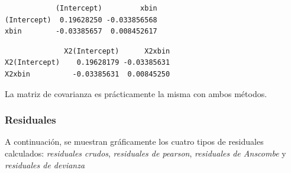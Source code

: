 \documentclass[
  letterpaper,
  DIV=11,
  numbers=noendperiod]{scrartcl}
\newenvironment{Shaded}{\begin{snugshade}}{\end{snugshade}}
\newcommand{\AttributeTok}[1]{\textcolor[rgb]{0.40,0.45,0.13}{#1}}
\newcommand{\FunctionTok}[1]{\textcolor[rgb]{0.28,0.35,0.67}{#1}}
\newcommand{\NormalTok}[1]{\textcolor[rgb]{0.00,0.23,0.31}{#1}}
\newcommand{\OtherTok}[1]{\textcolor[rgb]{0.00,0.23,0.31}{#1}}
\newcommand{\SpecialCharTok}[1]{\textcolor[rgb]{0.37,0.37,0.37}{#1}}
\begin{document}
\begin{verbatim}
            (Intercept)         xbin
(Intercept)  0.19628250 -0.033856568
xbin        -0.03385657  0.008452617
\end{verbatim}

\begin{verbatim}
              X2(Intercept)      X2xbin
X2(Intercept)    0.19628179 -0.03385631
X2xbin          -0.03385631  0.00845250
\end{verbatim}

La matriz de covarianza es prácticamente la misma con ambos métodos.

\subsubsection{Residuales}\label{residuales-2}

A continuación, se muestran gráficamente los cuatro tipos de residuales
calculados: \emph{residuales crudos}, \emph{residuales de pearson},
\emph{residuales de Anscombe} y \emph{residuales de devianza}

\begin{Shaded}
\end{Shaded}
\end{document}
